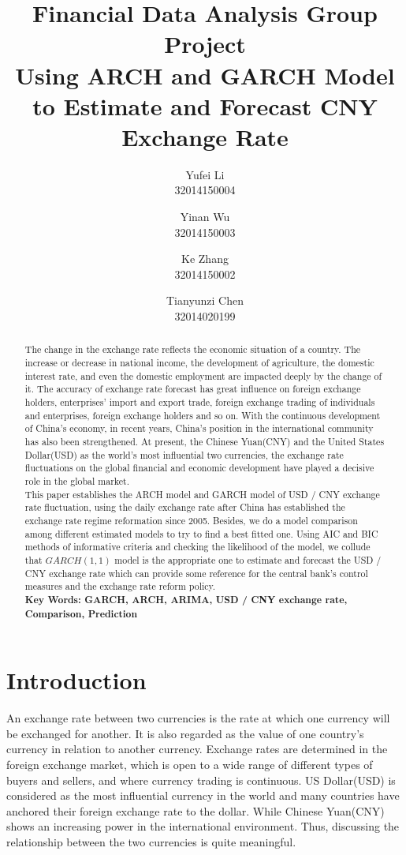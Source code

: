 \documentclass[12pt, a4paper, titlepage]{article}
\title{\textbf{Financial Data Analysis Group Project}\\
Using ARCH and GARCH Model to Estimate and Forecast CNY Exchange Rate
}
\author{Yufei Li  \\
	32014150004  \\
	\and 
	Yinan Wu \\
	32014150003 \\
	\and
	Ke Zhang\\
	32014150002\\
	\and
	Tianyunzi Chen\\
	32014020199
	}
\date{}
\begin{document}
\maketitle

\begin{abstract}
The change in the exchange rate reflects the economic situation of a country. The increase or decrease in national income, the development of agriculture, the domestic interest rate, and even the domestic employment are impacted deeply by the change of it. The accuracy of exchange rate forecast has great influence on foreign exchange holders, enterprises' import and export trade, foreign exchange trading of individuals and enterprises, foreign exchange holders and so on. With the continuous development of China's economy, in recent years, China's position in the international community has also been strengthened. At present, the Chinese Yuan(CNY) and the United States Dollar(USD) as the world's most influential two currencies, the exchange rate fluctuations on the global financial and economic development have played a decisive role in the global market.\\

This paper establishes the ARCH model and GARCH model of USD / CNY exchange rate fluctuation, using the daily exchange rate after China has established the exchange rate regime reformation since 2005. Besides, we do a model comparison among different estimated models to try to find a best fitted one. Using AIC and BIC methods of informative criteria and checking the likelihood of the model, we collude that $GARCH(1,1)$ model is the appropriate one to estimate and forecast the USD / CNY exchange rate which can provide some reference for the central bank's control measures and the exchange rate reform policy.\\

\textbf{Key Words: GARCH, ARCH, ARIMA, USD / CNY exchange rate, Comparison, Prediction} 
\end{abstract}

\tableofcontents 
\newpage

\section{Introduction}
An exchange rate between two currencies is the rate at which one currency will be exchanged for another. It is also regarded as the value of one country's currency in relation to another currency. Exchange rates are determined in the foreign exchange market, which is open to a wide range of different types of buyers and sellers, and where currency trading is continuous. US Dollar(USD) is considered as the most influential currency in the world and many countries have anchored their foreign exchange rate to the dollar. While Chinese Yuan(CNY) shows an increasing power in the international environment. Thus, discussing the relationship between the two currencies is quite meaningful.\\
 
\end{document}
